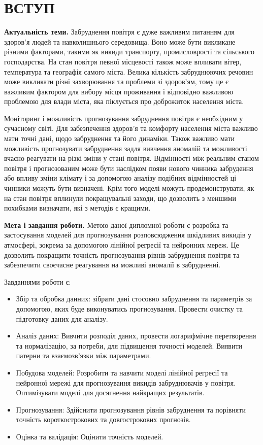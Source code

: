 \chapter*{ВСТУП}

{\bf{Актуальність теми.}}
Забруднення повітря є дуже важливим питанням для здоров'я людей та навколишнього середовища.
Воно може бути викликане різними факторами, такими як викиди транспорту, промисловрості та 
сільського господарства. На стан повітря певної місцевості також може впливати вітер, 
температура та географія самого міста. Велика кількість забруднюючих речовин може викликати 
різні захворювання та проблеми зі здоров'ям, тому це є важливим фактором для вибору місця 
проживання і відповідно важливою проблемою для влади міста, яка піклується про доброжиток 
населення міста.


Моніторинг і можливість прогнозування забруднення повітря є необхідним у сучасному світі. 
Для забезпечення здоров'я та комфорту населення міста важливо мати точні дані, щодо забруднення 
та його динаміки. Також важливо мати можливість прогнозувати забруднення задля вивчення 
аномалій та можливості вчасно реагувати на різкі зміни у стані повітря. Відмінності між 
реальним станом повітря і прогнозованим може бути наслідком появи нового чинника забрудення 
або впливу зміни клімату і за допомогою аналізу подібних відмінностей ці чинники можуть 
бути визначені.
Крім того моделі можуть продемонструвати, як на стан повітря вплинули покращувальні заходи,
що дозволить з меншими похибками визначати, які з методів є кращими. 

{\bf{Мета і завдання роботи.}}  
Метою даної дипломної роботи є розробка та застосування моделей для прогнозування розповсюдження шкідливих викидів у атмосфері, зокрема за допомогою лінійної регресії та нейронних мереж. Це дозволить покращити точність прогнозування рівнів забруднення повітря та забезпечити своєчасне реагування на можливі аномалії в забрудненні.

Завданнями роботи є:
\begin{itemize}
    \item Збір та обробка данних: зібрати дані стосовно забруднення та параметрів за допомогою, яких буде виконуватись прогнозування. Провести очистку та підготовку даних для аналізу.
    \item Аналіз даних: Вивчити розподіл даних, провести логарифмічне перетворення та нормалізацію, за потреби, для підвищення точності моделей. Виявити патерни та взаємозв'язки між параметрами.
    \item Побудова моделей: Розробити та навчити моделі лінійної регресії та нейронної мережі для прогнозування викидів забруднювачів у повітря. Оптимізувати моделі для досягнення найкращих результатів.
    \item Прогнозування: Здійснити прогнозування рівнів забруднення та порівняти точність короткострокових та довгострокових прогнозів.
    \item Оцінка та валідація: Оцінити точність моделей.
\end{itemize}

